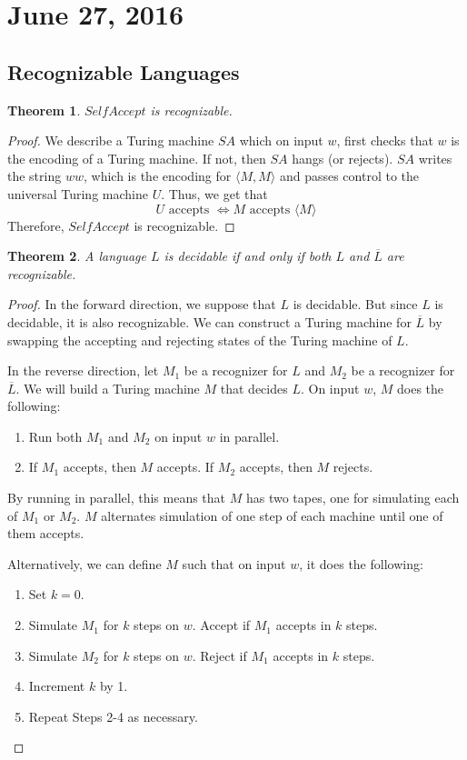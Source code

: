 \documentclass[11pt]{article}
\theoremstyle{plain} %
\newtheorem*{theorem}{Theorem}
\theoremstyle{definition}
\theoremstyle{example}
\theoremstyle{remark}
\begin{document}
\section{June 27, 2016}


\subsection{Recognizable Languages}

\begin{theorem}
$SelfAccept$ is recognizable.
\end{theorem}

\begin{proof}
We describe a Turing machine $SA$ which on input $w$, first checks that $w$ is the encoding of a Turing machine. If not, then $SA$ hangs (or rejects). $SA$ writes the string $ww$, which is the encoding for $\langle M,M\rangle$ and passes control to the universal Turing machine $U$. Thus, we get that 
$$U \text{ accepts } \iff M \text{ accepts } \langle M \rangle$$
Therefore, $SelfAccept$ is recognizable.
\end{proof}

\begin{theorem}
A language $L$ is decidable if and only if both $L$ and $\overline{L}$ are recognizable.
\end{theorem}

\begin{proof}
In the forward direction, we suppose that $L$ is decidable. But since $L$ is decidable, it is also recognizable. We can construct a Turing machine for $\overline{L}$ by swapping the accepting and rejecting states of the Turing machine of $L$.

In the reverse direction, let $M_1$ be a recognizer for $L$ and $M_2$ be a recognizer for $\overline{L}$. We will build a Turing machine $M$ that decides $L$. On input $w$, $M$ does the following:

\begin{enumerate}
	\item Run both $M_1$ and $M_2$ on input $w$ in parallel.
	\item If $M_1$ accepts, then $M$ accepts. If $M_2$ accepts, then $M$ rejects.
\end{enumerate}  

By running in parallel, this means that $M$ has two tapes, one for simulating each of $M_1$ or $M_2$. $M$ alternates simulation of one step of each machine until one of them accepts. 

Alternatively, we can define $M$ such that on input $w$, it does the following:

\begin{enumerate}
	\item Set $k=0$.
	\item Simulate $M_1$ for $k$ steps on $w$. Accept if $M_1$ accepts in $k$ steps.
	\item Simulate $M_2$ for $k$ steps on $w$. Reject if $M_1$ accepts in $k$ steps.
	\item Increment $k$ by 1.
	\item Repeat Steps 2-4 as necessary.
\end{enumerate}
\end{proof}
\end{document}
